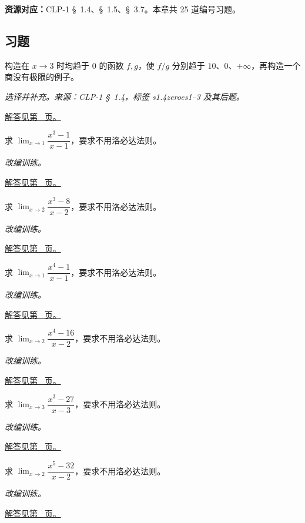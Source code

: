 \documentclass[UTF8,12pt,a4paper,fontset=fandol]{ctexart}
\begin{document}
\textbf{资源对应：}CLP-1 \S~1.4、\S~1.5、\S~3.7。本章共 25 道编号习题。
\subsection{习题}
\begin{example}[零比零不能直接运算]\label{ex:c3q1}
构造在 $x\to3$ 时均趋于 $0$ 的函数 $f,g$，使 $f/g$ 分别趋于 $10$、$0$、$+\infty$，再构造一个商没有极限的例子。
\par\textit{选译并补充。来源：CLP-1 \S~1.4，标签 s1.4zeroes1--3 及其后题。}\par\hyperref[ans:c3q1]{解答见第~\pageref{ans:c3q1} 页。}
\end{example}
\begin{example}[差幂因式分解]\label{ex:c3q2}
求 $\displaystyle\lim_{x\to 1}\dfrac{x^{3}-1}{x-1}$，要求不用洛必达法则。
\par\textit{改编训练。}\par\hyperref[ans:c3q2]{解答见第~\pageref{ans:c3q2} 页。}
\end{example}
\begin{example}[差幂因式分解]\label{ex:c3q3}
求 $\displaystyle\lim_{x\to 2}\dfrac{x^{3}-8}{x-2}$，要求不用洛必达法则。
\par\textit{改编训练。}\par\hyperref[ans:c3q3]{解答见第~\pageref{ans:c3q3} 页。}
\end{example}
\begin{example}[差幂因式分解]\label{ex:c3q4}
求 $\displaystyle\lim_{x\to 1}\dfrac{x^{4}-1}{x-1}$，要求不用洛必达法则。
\par\textit{改编训练。}\par\hyperref[ans:c3q4]{解答见第~\pageref{ans:c3q4} 页。}
\end{example}
\begin{example}[差幂因式分解]\label{ex:c3q5}
求 $\displaystyle\lim_{x\to 2}\dfrac{x^{4}-16}{x-2}$，要求不用洛必达法则。
\par\textit{改编训练。}\par\hyperref[ans:c3q5]{解答见第~\pageref{ans:c3q5} 页。}
\end{example}
\begin{example}[差幂因式分解]\label{ex:c3q6}
求 $\displaystyle\lim_{x\to 3}\dfrac{x^{3}-27}{x-3}$，要求不用洛必达法则。
\par\textit{改编训练。}\par\hyperref[ans:c3q6]{解答见第~\pageref{ans:c3q6} 页。}
\end{example}
\begin{example}[差幂因式分解]\label{ex:c3q7}
求 $\displaystyle\lim_{x\to 2}\dfrac{x^{5}-32}{x-2}$，要求不用洛必达法则。
\par\textit{改编训练。}\par\hyperref[ans:c3q7]{解答见第~\pageref{ans:c3q7} 页。}
\end{example}
\end{document}
